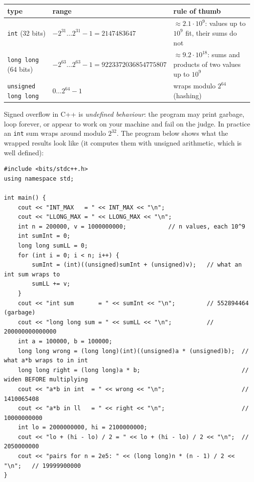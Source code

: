 \begin{table}[H]
\centering\small
\renewcommand{\arraystretch}{1.2}
\begin{tabularx}{\linewidth}{@{}l l >{\raggedright\arraybackslash}X@{}}
\toprule
\textbf{type} & \textbf{range} & \textbf{rule of thumb} \\
\midrule
\texttt{int} (32 bits) & $-2^{31} \dots 2^{31}-1 = 2147483647$ & $\approx 2.1\cdot10^9$: values up to $10^9$ fit, their sums do not \\
\texttt{long long} (64 bits) & $-2^{63} \dots 2^{63}-1 = 9223372036854775807$ & $\approx 9.2\cdot10^{18}$: sums and products of two values up to $10^9$ \\
\texttt{unsigned long long} & $0 \dots 2^{64}-1$ & wraps modulo $2^{64}$ (hashing) \\
\bottomrule
\end{tabularx}
\end{table}

Signed overflow in C++ is \emph{undefined behaviour}: the program may print garbage, loop forever, or appear to work on your machine and fail on the judge. In practice an \texttt{int} sum wraps around modulo $2^{32}$. The program below shows what the wrapped results look like (it computes them with unsigned arithmetic, which is well defined):

\begin{lstlisting}[style=cpp]
#include <bits/stdc++.h>
using namespace std;

int main() {
    cout << "INT_MAX   = " << INT_MAX << "\n";
    cout << "LLONG_MAX = " << LLONG_MAX << "\n";
    int n = 200000, v = 1000000000;            // n values, each 10^9
    int sumInt = 0;
    long long sumLL = 0;
    for (int i = 0; i < n; i++) {
        sumInt = (int)((unsigned)sumInt + (unsigned)v);   // what an int sum wraps to
        sumLL += v;
    }
    cout << "int sum       = " << sumInt << "\n";         // 552894464  (garbage)
    cout << "long long sum = " << sumLL << "\n";          // 200000000000000
    int a = 100000, b = 100000;
    long long wrong = (long long)(int)((unsigned)a * (unsigned)b);  // what a*b wraps to in int
    long long right = (long long)a * b;                             // widen BEFORE multiplying
    cout << "a*b in int  = " << wrong << "\n";                      // 1410065408
    cout << "a*b in ll   = " << right << "\n";                      // 10000000000
    int lo = 2000000000, hi = 2100000000;
    cout << "lo + (hi - lo) / 2 = " << lo + (hi - lo) / 2 << "\n";  // 2050000000
    cout << "pairs for n = 2e5: " << (long long)n * (n - 1) / 2 << "\n";   // 19999900000
}
\end{lstlisting}

